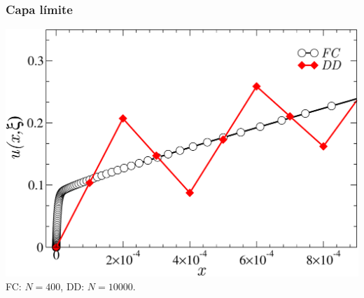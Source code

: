 \begin{frame}
\frametitle{Capa límite}
\centering
  \includegraphics[width=1.0\textwidth]{figuras/layerlar.pdf}\\
FC: $N=400$, DD: $N=10000$.


\end{frame}




